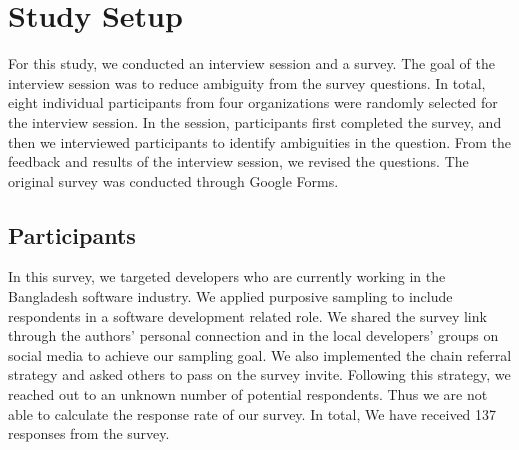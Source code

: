 \section{Study Setup}
\label{study_setup}

For this study, we conducted an interview session and a survey. The goal of the interview session was to reduce ambiguity from the survey questions. In total, eight individual participants from four organizations were randomly selected for the interview session. In the session, participants first completed the survey, and then we interviewed participants to identify ambiguities in the question. From the feedback and results of the interview session, we revised the questions. The original survey was conducted through Google Forms.

\subsection{Participants}
\label{survey_participants}
In this survey, we targeted developers who are currently working in the Bangladesh software industry. We applied purposive sampling\cite{Vogt2005} to include respondents in a software development related role. We shared the survey link through the authors' personal connection and in the local developers' groups on social media to achieve our sampling goal. We also implemented the chain referral strategy\cite{creswell2013} and asked others to pass on the survey invite. Following this strategy, we reached out to an unknown number of potential respondents. Thus we are not able to calculate the response rate of our survey. In total, We have received 137 responses from the survey. 

